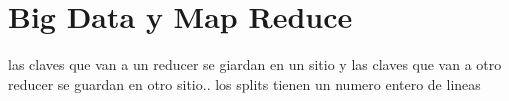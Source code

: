 \chapter{Big Data y Map Reduce}\label{Chapter1} 



las claves que van a un reducer se giardan en un sitio y las claves que van a otro reducer se guardan en otro sitio.. 
los splits tienen un numero entero de lineas
